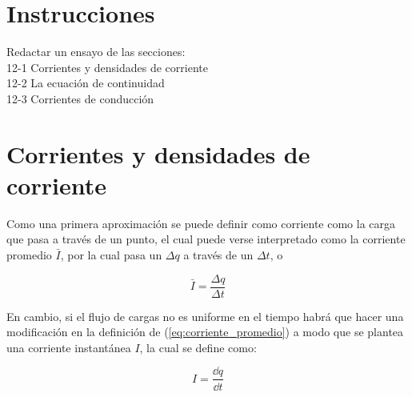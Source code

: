 \documentclass[11pt]{report}
\theoremstyle{plain}
\theoremstyle{definition}
\begin{document}


\section*{Instrucciones}
Redactar un ensayo de las secciones:\\
12-1 Corrientes y densidades de corriente\\
12-2 La ecuación de continuidad\\
12-3 Corrientes de conducción

\section*{Corrientes y densidades de corriente}

Como una primera aproximación se puede definir como corriente como la carga que pasa a través de un punto, el cual puede verse interpretado como la corriente promedio $\bar{I}$, por la cual pasa un $\Delta q$ a través de un $\Delta t$, o 

\begin{equation}
	\bar{I} = \frac{\Delta q}{\Delta t}
	\label{eq:corriente_promedio}
\end{equation}

En cambio, si el flujo de cargas no es uniforme en el tiempo habrá que hacer una modificación en la definición de (\ref{eq:corriente_promedio}) a modo que se plantea una corriente instantánea $I$, la cual se define como:

\begin{equation}
	I = \frac{\dd{q}}{\dd{t}}
	\label{eq:corriente_instantanea}
\end{equation}
\end{document}
